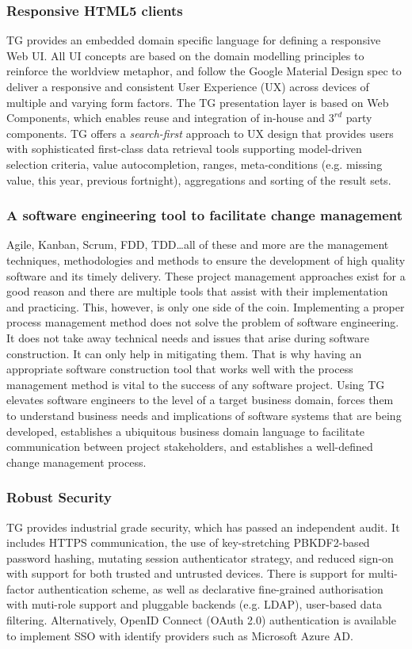 \documentclass[a4paper,10pt,twocolumn,oneside,openright,final]{memoir}
\begin{document}

\subsubsection*{Responsive HTML5 clients}
	TG provides an embedded domain specific language for defining a responsive Web UI.
	All UI concepts are based on the domain modelling principles to reinforce the worldview metaphor, and follow the Google Material Design spec to deliver a responsive and consistent User Experience (UX) across devices of multiple and varying form factors.
	The TG presentation layer is based on Web Components, which enables reuse and integration of in-house and $3^{rd}$ party components.
	TG offers a \emph{search-first} approach to UX design that provides users with sophisticated first-class data retrieval tools supporting model-driven selection criteria, value autocompletion, ranges, meta-conditions (e.g. missing value, this year, previous fortnight), aggregations and sorting of the result sets.


\subsubsection*{A software engineering tool to facilitate change management}
	Agile, Kanban, Scrum, FDD, TDD\ldots all of these and more are the management techniques, methodologies and methods to ensure the development of high quality software and its timely delivery.
	These project management approaches exist for a good reason and there are multiple tools that assist with their implementation and practicing.
	This, however, is only one side of the coin.
	Implementing a proper process management method does not solve the problem of software engineering.
	It does not take away technical needs and issues that arise during software construction.
	It can only help in mitigating them.
	That is why having an appropriate software construction tool that works well with the process management method is vital to the success of any software project.
	Using TG elevates software engineers to the level of a target business domain, forces them to understand business needs and implications of software systems that are being developed, establishes a ubiquitous business domain language to facilitate communication between project stakeholders, and establishes a well-defined change management process.

\subsubsection*{Robust Security}
	TG provides industrial grade security, which has passed an independent audit.
	It includes HTTPS communication, the use of key-stretching PBKDF2-based password hashing, mutating session authenticator strategy, and reduced sign-on with support for both trusted and untrusted devices.
    There is support for multi-factor authentication scheme, as well as declarative fine-grained authorisation with muti-role support and pluggable backends (e.g. LDAP), user-based data filtering.
    Alternatively, OpenID Connect (OAuth 2.0) authentication is available to implement SSO with identify providers such as Microsoft Azure AD.
\end{document}
